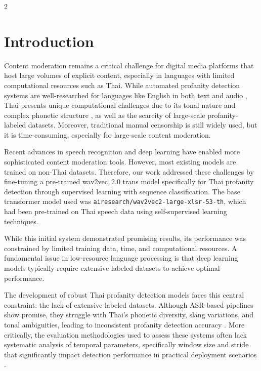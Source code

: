 \documentclass[11pt,a4paper]{article}
\begin{document}
\begin{multicols}{2}

\section{Introduction}
Content moderation remains a critical challenge for digital media platforms that host large volumes of explicit content, especially in languages with limited computational resources such as Thai. While automated profanity detection systems are well-researched for languages like English in both text \cite{Davidson_Warmsley_Macy_Weber_2017} and audio \cite{9900333}, Thai presents unique computational challenges due to its tonal nature and complex phonetic structure \cite{THEERAUMPON201113254}, as well as the scarcity of large-scale profanity-labeled datasets. Moreover, traditional manual censorship is still widely used, but it is time-consuming, especially for large-scale content moderation.

Recent advances in speech recognition and deep learning have enabled more sophisticated content moderation tools. However, most existing models are trained on non-Thai datasets. Therefore, our work addressed these challenges by fine-tuning a pre-trained wav2vec~2.0 trans model \cite{baevski2020wav2vec20frameworkselfsupervised} specifically for Thai profanity detection through supervised learning with sequence classification. The base transformer model used was \texttt{airesearch/wav2vec2-large-xlsr-53-th}, which had been pre-trained on Thai speech data using self-supervised learning techniques.

While this initial system demonstrated promising results, its performance was constrained by limited training data, time, and computational resources. A fundamental issue in low-resource language processing is that deep learning models typically require extensive labeled datasets to achieve optimal performance.

The development of robust Thai profanity detection models faces this central constraint: the lack of extensive labeled datasets. Although ASR-based pipelines show promise, they struggle with Thai's phonetic diversity, slang variations, and tonal ambiguities, leading to inconsistent profanity detection accuracy \cite{THEERAUMPON201113254,suwanbandit2024improving}. More critically, the evaluation methodologies used to assess these systems often lack systematic analysis of temporal parameters, specifically window size and stride that significantly impact detection performance in practical deployment scenarios \cite{9900333,9665775,app6060162}.


\end{multicols}
\end{document}
